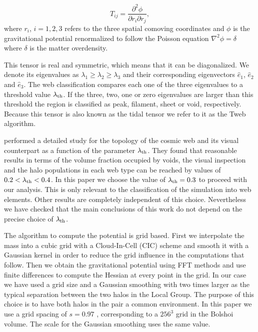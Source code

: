 \documentclass{emulateapj}
\newcommand{\manuscript}{paper }
\newcommand{\hMpc}{{\ifmmode{h^{-1}{\rm Mpc}}\else{$h^{-1}$Mpc }\fi}}
\begin{document}
\begin{equation}
T_{ij} = \frac{\partial^2 \phi}{\partial r_i \partial r_j}, 
\end{equation}
%
where $r_{i}$, $i=1,2,3$ refers to the three spatial comoving
coordinates and $\phi$ is the gravitational potential renormalized to
follow the Poisson equation $\nabla^2\phi=\delta$ where
$\delta$ is the matter overdensity.  

This tensor is real and symmetric, which means that it can be
diagonalized. 
We denote its eigenvalues as $\lambda_1\geq \lambda_2\geq
\lambda_3$ and their corresponding eigenvectors $\hat{e}_1$,
$\hat{e}_2$ and $\hat{e}_3$. 
The web classification compares each one
of the three eigenvalues to a threshold value $\lambda_{\rm th}$. 
If
the three, two, one or zero eigenvalues are larger than this threshold
the region is classified as peak, filament, sheet or void,
respectively.  Because this tensor is also known as the tidal tensor
we refer to it as the Tweb algorithm. 


\cite{Tweb} performed a detailed study for the topology of the
cosmic web and its visual counterpart as a function of the parameter
$\lambda_{\rm th}$. 
They found that reasonable results in terms of the
volume fraction occupied by voids, the visual inspection and the halo
populations in each web type can be reached by values of $0.2<\lambda_{\rm
th}<0.4$. 
In this \manuscript we choose the value of $\lambda_{\rm
  th}=0.3$ to proceed with our analysis. 
This is only relevant to the classification of the simulation into web
elements. Other results are completely independent of this
choice. Nevertheless we have checked that the main conclusions of this
work do not depend on the precise choice of $\lambda_{\rm th}$.


The algorithm to compute the potential is grid based. 
First we interpolate the mass into a cubic grid with a
Cloud-In-Cell (CIC) scheme and smooth it with a Gaussian kernel in order to reduce the grid influence in the computations that follow. 
Then we obtain the gravitational potential using FFT methods and use finite differences
to compute the Hessian at every point in the grid. 
In our case we have used a grid size and a Gaussian smoothing with
two times larger as the typical separation between the two halos in the Local Group. 
The purpose of this choice is to have both halos in the pair a common
environment. 
In this \manuscript we use a grid spacing of $s=0.97$ \hMpc,
corresponding to a $256^3$ grid in the Bolshoi volume. 
The scale for the Gaussian smoothing uses the same value. 
\end{document}

